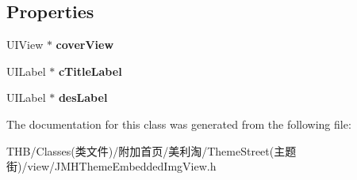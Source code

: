 \subsection*{Properties}
\begin{DoxyCompactItemize}
\item 
\mbox{\label{interface_j_m_h_theme_embedded_img_view_ae462b3eb1a3d5c3e7da1f806f304ac9a}} 
U\+I\+View $\ast$ {\bfseries cover\+View}
\item 
\mbox{\label{interface_j_m_h_theme_embedded_img_view_ad54db69d5659647c0d8b4b8e9b2d9329}} 
U\+I\+Label $\ast$ {\bfseries c\+Title\+Label}
\item 
\mbox{\label{interface_j_m_h_theme_embedded_img_view_ae3dc74c31dc20dd311005ca855cb12a9}} 
U\+I\+Label $\ast$ {\bfseries des\+Label}
\end{DoxyCompactItemize}


The documentation for this class was generated from the following file\+:\begin{DoxyCompactItemize}
\item 
T\+H\+B/\+Classes(类文件)/附加首页/美利淘/\+Theme\+Street(主题街)/view/J\+M\+H\+Theme\+Embedded\+Img\+View.\+h\end{DoxyCompactItemize}
